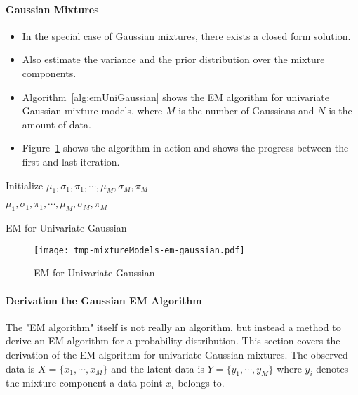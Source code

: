 				\paragraph{Gaussian Mixtures}
					\begin{itemize}
						\item In the special case of Gaussian mixtures, there exists a closed form solution.
						\item Also estimate the variance and the prior distribution over the mixture components.
						\item Algorithm~\ref{alg:emUniGaussian} shows the EM algorithm for univariate Gaussian mixture models, where \(M\) is the number of Gaussians and \(N\) is the amount of data.
						\item Figure~\ref{fig:emUniGaussian} shows the algorithm in action and shows the progress between the first and last iteration.
					\end{itemize}

					\begin{algorithm}
						Initialize \( \mu_1, \sigma_1, \pi_1, \cdots, \mu_M, \sigma_M, \pi_M \)


						\Return \( \mu_1, \sigma_1, \pi_1, \cdots, \mu_M, \sigma_M, \pi_M \)

						\caption{EM for Univariate Gaussian}
						\label{alg:emUniGaussian}
					\end{algorithm}

					\begin{figure}
						\centering
						\texttt{[image: tmp-mixtureModels-em-gaussian.pdf]}
						\caption{EM for Univariate Gaussian}
						\label{fig:emUniGaussian}
					\end{figure}

				\paragraph{Derivation the Gaussian EM Algorithm}
					The "EM algorithm" itself is not really an algorithm, but instead a method to derive an EM algorithm for a probability distribution. This section covers the derivation of the EM algorithm for univariate Gaussian mixtures. The observed data is \( X = \{ x_1, \cdots, x_M \} \) and the latent data is \( Y = \{ y_1, \cdots, y_M \} \) where \(y_i\) denotes the mixture component a data point \(x_i\) belongs to.


